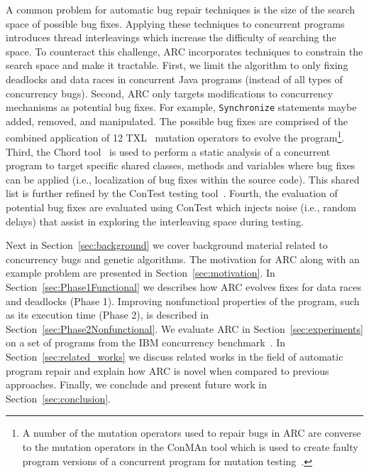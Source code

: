 \documentclass[runningheads,a4paper]{llncs}
\begin{document}
A common problem for automatic bug repair techniques is the size of the search space of possible bug fixes. Applying these techniques to  concurrent programs introduces thread interleavings which increase the difficulty of searching the space. To counteract this challenge, ARC incorporates techniques to constrain the search space and make it tractable. First, we limit the algorithm to only fixing deadlocks and data races in concurrent Java programs (instead of all types of concurrency bugs). Second, ARC only targets modifications to concurrency mechanisms as potential bug fixes. For example, \texttt{Synchronize} statements maybe added, removed, and manipulated. The possible bug fixes are comprised of the combined application of 12 TXL~\cite{CHP91} mutation operators to evolve the program\footnote{A number of the mutation operators used to repair bugs in ARC are converse to the mutation operators in the ConMAn tool which is used to create faulty program versions of a concurrent program for mutation testing~\cite{BCD06}.}.  Third, the Chord tool~\cite{NA07} is used to perform a static analysis of a concurrent program to target specific shared classes, methods and variables where bug fixes can be applied (i.e., localization of bug fixes within the source code). This shared list is further refined by the ConTest testing tool~\cite{EFN+02}. Fourth, the evaluation of potential bug fixes are evaluated using ConTest which injects noise (i.e., random delays) that assist in exploring the interleaving space during testing. 


Next in Section~\ref{sec:background} we cover background material related to concurrency bugs and genetic algorithms. The motivation for ARC along with an example problem are presented in Section~\ref{sec:motivation}. In Section~\ref{sec:Phase1Functional} we describes how ARC evolves fixes for data races and deadlocks (Phase 1). Improving nonfunctioal properties of the program, such as its execution time (Phase 2), is described in Section~\ref{sec:Phase2Nonfunctional}. We evaluate ARC in Section~\ref{sec:experiments} on a set of programs from the IBM concurrency benchmark~\cite{HSU03, EU04, ETU08}. In Section~\ref{sec:related_works} we discuss related works in the field of automatic program repair and explain how ARC is novel when compared to previous approaches. Finally, we conclude and present future work in Section~\ref{sec:conclusion}.
\end{document}

